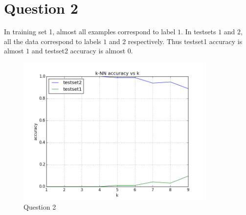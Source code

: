 \documentclass[a4paper]{article}
\begin{document}
\section{Question 2}
In training set 1, almost all examples correspond to label $1$. In testsets $1$ and $2$, all the data correspond to labels $1$ and $2$ respectively. Thus testset1 accuracy is almost $1$ and testset2 accuracy is almost $0$.
\begin{figure}[h]
\centering
\includegraphics[width = 3.9in]{q2.png}
\caption{Question 2}
\end{figure}
\end{document}

